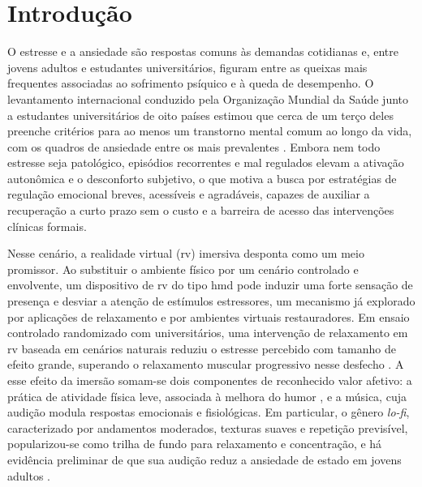 \chapter{Introdução}\label{cap:introducao}

\glsresetall

O estresse e a ansiedade são respostas comuns às demandas cotidianas e, entre jovens adultos e estudantes universitários, figuram entre as queixas mais frequentes associadas ao sofrimento psíquico e à queda de desempenho. O levantamento internacional conduzido pela Organização Mundial da Saúde junto a estudantes universitários de oito países estimou que cerca de um terço deles preenche critérios para ao menos um transtorno mental comum ao longo da vida, com os quadros de ansiedade entre os mais prevalentes \citep{Auerbach2018}. Embora nem todo estresse seja patológico, episódios recorrentes e mal regulados elevam a ativação autonômica e o desconforto subjetivo, o que motiva a busca por estratégias de regulação emocional breves, acessíveis e agradáveis, capazes de auxiliar a recuperação a curto prazo sem o custo e a barreira de acesso das intervenções clínicas formais.

Nesse cenário, a realidade virtual (\gls{rv}) imersiva desponta como um meio promissor. Ao substituir o ambiente físico por um cenário controlado e envolvente, um dispositivo de \gls{rv} do tipo \gls{hmd} pode induzir uma forte sensação de presença e desviar a atenção de estímulos estressores, um mecanismo já explorado por aplicações de relaxamento e por ambientes virtuais restauradores. Em ensaio controlado randomizado com universitários, uma intervenção de relaxamento em \gls{rv} baseada em cenários naturais reduziu o estresse percebido com tamanho de efeito grande, superando o relaxamento muscular progressivo nesse desfecho \citep{Ahn2025}. A esse efeito da imersão somam-se dois componentes de reconhecido valor afetivo: a prática de atividade física leve, associada à melhora do humor \citep{Marques2023}, e a música, cuja audição modula respostas emocionais e fisiológicas. Em particular, o gênero \textit{lo-fi}, caracterizado por andamentos moderados, texturas suaves e repetição previsível, popularizou-se como trilha de fundo para relaxamento e concentração, e há evidência preliminar de que sua audição reduz a ansiedade de estado em jovens adultos \citep{Dsouza2024}.


